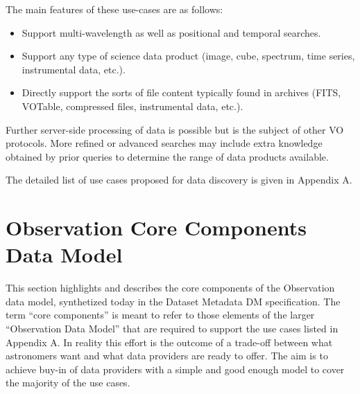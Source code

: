 \documentclass[11pt,a4paper]{ivoa}
\begin{document}
The main features of these use-cases are as follows:

\begin{itemize}
\item Support multi-wavelength as well as positional and temporal searches.
\item Support any type of science data product (image, cube, spectrum, time series, instrumental data, etc.).
\item Directly support the sorts of file content typically found in archives (FITS, VOTable, compressed files,
instrumental data, etc.).
\end{itemize}
Further server-side processing of data is possible but is the subject of other VO protocols.  More refined or advanced
searches may include extra knowledge obtained by prior queries to determine the range of data products available.

The detailed list of use cases proposed for data discovery is given in Appendix A.




\iffalse %
\section[Observation Core Components Data Model]{Observation Core Components Data Model}
\label{sec:core-components}This section highlights and describes the core components of the Observation data model,
synthetized today in the Dataset Metadata DM specification. The term ``core components'' is meant to refer to those
elements of the larger ``Observation Data Model'' that are required to support the use cases listed in Appendix A.  In
reality this effort is the outcome of a trade-off between what astronomers want and what data providers are ready to
offer.  The aim is to achieve buy-in of data providers with a simple and {\textquotedbl}good enough{\textquotedbl}
model to cover the majority of the use cases.
\end{document}
